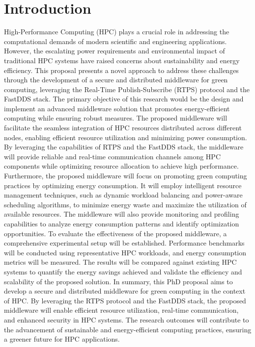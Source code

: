 \section{Introduction}
High-Performance Computing (HPC) plays a crucial role in addressing the computational demands of modern scientific and engineering applications. However, the escalating power requirements and environmental impact of traditional HPC systems have raised concerns about sustainability and energy efficiency. This proposal presents a novel approach to address these challenges through the development of a secure and distributed middleware for green computing, leveraging the Real-Time Publish-Subscribe (RTPS) protocol and the FastDDS stack. The primary objective of this research would be the design and implement an advanced middleware solution that promotes energy-efficient computing while ensuring robust measures. The proposed middleware will facilitate the seamless integration of HPC resources distributed across different nodes, enabling efficient resource utilization and minimizing power consumption. By leveraging the capabilities of RTPS and the FastDDS stack, the middleware will provide reliable and real-time communication channels among HPC components while optimizing resource allocation to achieve high performance. Furthermore, the proposed middleware will focus on promoting green computing practices by optimizing energy consumption. It will employ intelligent resource management techniques, such as dynamic workload balancing and power-aware scheduling algorithms, to minimize energy waste and maximize the utilization of available resources. The middleware will also provide monitoring and profiling capabilities to analyze energy consumption patterns and identify optimization opportunities. To evaluate the effectiveness of the proposed middleware, a comprehensive experimental setup will be established. Performance benchmarks will be conducted using representative HPC workloads, and energy consumption metrics will be measured. The results will be compared against existing HPC systems to quantify the energy savings achieved and validate the efficiency and scalability of the proposed solution. In summary, this PhD proposal aims to develop a secure and distributed middleware for green computing in the context of HPC. By leveraging the RTPS protocol and the FastDDS stack, the proposed middleware will enable efficient resource utilization, real-time communication, and enhanced security in HPC systems. The research outcomes will contribute to the advancement of sustainable and energy-efficient computing practices, ensuring a greener future for HPC applications.

